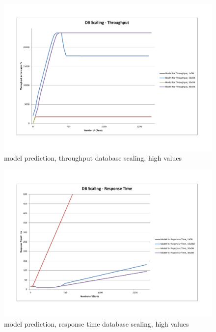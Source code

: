 \documentclass[a4paper]{article}
\begin{document}
\begin{landscape}
\begin{figure}[H]
	\begin{center}
    \includegraphics[scale=0.7, trim = 23mm 28mm 24mm 25mm, clip]{measurements_increase_load/tp_db_scale2.pdf}
  \end{center}
  \caption{model prediction, throughput database scaling, high values}
  \label{fig:tp-db-scale2}
\end{figure}

\begin{figure}[H]
	\begin{center}
    \includegraphics[scale=0.7, trim = 23mm 28mm 24mm 25mm, clip]{measurements_increase_load/rt_db_scale2.pdf}
  \end{center}
  \caption{model prediction, response time database scaling, high values}
  \label{fig:rt-db-scale2}
\end{figure}


\end{landscape}
\end{document}

